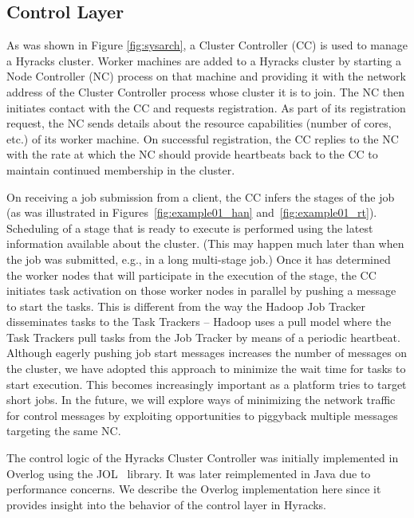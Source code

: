 \subsection{Control Layer}
\label{ch:hyracks:sec:implementation:subsec:control}

As was shown in Figure \ref{fig:sysarch}, a Cluster Controller (CC) is used to manage a Hyracks cluster.
Worker machines are added to a Hyracks cluster by starting a Node Controller (NC) process on that machine and
providing it with the network address of the Cluster Controller process whose cluster it is to join. The NC then initiates
contact with the CC and requests registration.
As part of its registration request, the NC sends details about the resource capabilities (number of cores, etc.) of its worker machine.
On successful registration, the CC replies to the NC with the rate at which the NC should provide heartbeats back to the CC to maintain continued membership in the cluster.

On receiving a job submission from a client, the CC infers the stages of the job (as was illustrated in Figures~\ref{fig:example01_han} and~\ref{fig:example01_rt}). Scheduling of a stage that is ready
to execute is performed using the latest information available about the cluster. (This may happen much later than when the job was submitted, e.g., in a long multi-stage job.)
Once it has determined the worker nodes that will participate in the execution of the stage, the CC initiates task activation on those worker nodes in parallel by pushing a
message to start the tasks. This is different from the way the Hadoop Job Tracker disseminates tasks to the Task Trackers -- Hadoop uses a pull model where the Task Trackers pull
tasks from the Job Tracker by means of a periodic heartbeat.
Although eagerly pushing job start messages increases the number of messages on the cluster, we have adopted this approach to minimize the wait time for tasks to start execution.
This becomes increasingly important as a platform tries to target short jobs.
In the future, we will explore ways of minimizing the network traffic for control messages by exploiting opportunities to piggyback multiple messages targeting the same NC.

The control logic of the Hyracks Cluster Controller was initially implemented in Overlog \cite{BOOM} using the JOL~\cite{jol:website} library. It was later reimplemented in Java due to performance concerns. We describe the Overlog implementation here since it provides insight into the behavior of the control layer in Hyracks.

